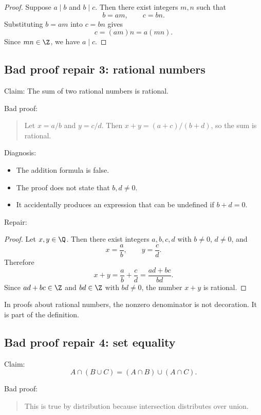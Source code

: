 \begin{proof}
Suppose $a\mid b$ and $b\mid c$. Then there exist integers $m,n$ such that
\[
b=am,\qquad c=bn.
\]
Substituting $b=am$ into $c=bn$ gives
\[
c=(am)n=a(mn).
\]
Since $mn\in\Z$, we have $a\mid c$.
\end{proof}

\subsection{Bad proof repair 3: rational numbers}

Claim: The sum of two rational numbers is rational.

Bad proof:

\begin{quote}
Let $x=a/b$ and $y=c/d$. Then $x+y=(a+c)/(b+d)$, so the sum is rational.
\end{quote}

Diagnosis:

\begin{itemize}
\item The addition formula is false.
\item The proof does not state that $b,d\neq0$.
\item It accidentally produces an expression that can be undefined if $b+d=0$.
\end{itemize}

Repair:

\begin{proof}
Let $x,y\in\Q$. Then there exist integers $a,b,c,d$ with $b\neq0$, $d\neq0$, and
\[
x=\frac ab,\qquad y=\frac cd.
\]
Therefore
\[
x+y=\frac ab+\frac cd=\frac{ad+bc}{bd}.
\]
Since $ad+bc\in\Z$ and $bd\in\Z$ with $bd\neq0$, the number $x+y$ is rational.
\end{proof}

\begin{trapbox}
In proofs about rational numbers, the nonzero denominator is not decoration. It is part of the definition.
\end{trapbox}

\subsection{Bad proof repair 4: set equality}

Claim:
\[
A\cap(B\cup C)=(A\cap B)\cup(A\cap C).
\]

Bad proof:

\begin{quote}
This is true by distribution because intersection distributes over union.
\end{quote}

